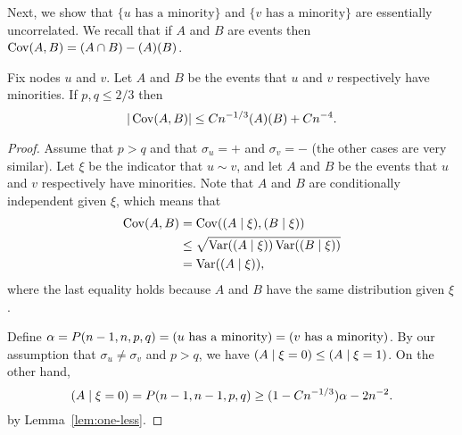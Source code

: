 \documentclass[EJP]{ejpecp}
\newcommand{\1}[1]{\mathbbm{1}_{\{#1\}}}
\let\Pr\relax
\DeclareMathOperator{\Pr}{Pr}
\DeclareMathOperator{\Var}{Var}
\DeclareMathOperator{\Cov}{Cov}
\begin{document}
Next, we show that $\{u \text{ has a minority}\}$ and
$\{v \text{ has a minority}\}$ are essentially uncorrelated.
We recall that if $A$ and $B$ are events then
$\Cov(A, B) = \Pr(A \cap B) - \Pr(A) \Pr(B)$.

\begin{lemma}\label{lem:minority-covariance}
Fix nodes $u$ and $v$. Let $A$ and $B$
be the events that $u$ and $v$ respectively have minorities.
If $p, q \le 2/3$ then
\[
  |\Cov(A, B)| \le C n^{-1/3} \Pr(A) \Pr(B) + C n^{-4}.
\]
\end{lemma}

\begin{proof}
 Assume that $p > q$ and that $\sigma_u = +$ and $\sigma_v = -$
 (the other cases are very similar).
 Let $\xi$ be the indicator that $u \sim v$, and let $A$ and $B$
 be the events that $u$ and $v$ respectively have minorities.
 Note that $A$ and $B$ are conditionally independent given $\xi$,
 which means that
 \begin{align*}
  \Cov(A, B)
  &= \Cov(\Pr(A \mid \xi), \Pr(B \mid \xi)) \\
  &\le \sqrt{\Var(\Pr(A \mid \xi)) \Var(\Pr(B \mid \xi))} \\
  &= \Var(\Pr(A \mid \xi)),
 \end{align*}
 where the last equality holds because $A$ and $B$ have the same
 distribution given $\xi$.

 Define
 $\alpha = P(n-1, n, p, q) = \Pr(\text{$u$ has a minority}) =
 \Pr(\text{$v$ has a minority})$. By our assumption that
 $\sigma_u \ne \sigma_v$ and $p > q$, we have
 $\Pr(A \mid \xi = 0) \le \Pr(A \mid \xi = 1)$.
 On the other hand,
 \[
   \Pr(A \mid \xi = 0) = P(n-1, n-1, p, q) \ge (1 - C n^{-1/3}) \alpha - 2n^{-2}.
 \]
 by Lemma~\ref{lem:one-less}.


\end{proof}
\end{document}
